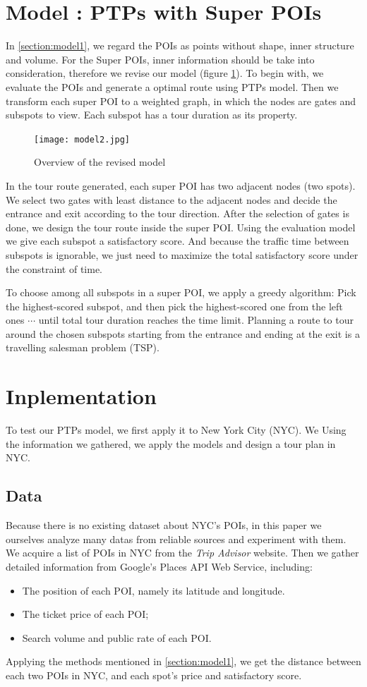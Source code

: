\documentclass{mcmthesis}
\newcommand{\RNum}[1]{\uppercase\expandafter{\romannumeral #1\relax}}
\begin{document}
\section{Model \RNum{2}: PTPs with Super POIs} \label{section:model2}
  In \ref{section:model1}, we regard the POIs as points without shape, inner structure and volume. For the Super POIs, inner information should be take into consideration, therefore we revise our model (figure \ref{fig:model2}). To begin with, we evaluate the POIs and generate a optimal route using PTPs model. Then we transform each super POI to a weighted graph, in which the nodes are gates and subspots to view. Each subspot has a tour duration as its property. \par
  \begin{figure}[h]
    \centering
    \texttt{[image: model2.jpg]}
    \caption{Overview of the revised model}
    \label{fig:model2}
  \end{figure}
  In the tour route generated, each super POI has two adjacent nodes (two spots). We select two gates with least distance to the adjacent nodes and decide the entrance and exit according to the tour direction. After the selection of gates is done, we design the tour route inside the super POI. Using the evaluation model we give each subspot a satisfactory score. And because the traffic time between subspots is ignorable, we just need to maximize the total satisfactory score under the constraint of time. \par
  To choose among all subspots in a super POI, we apply a greedy algorithm: Pick the highest-scored subspot, and then pick the highest-scored one from the left ones $\cdots$ until total tour duration reaches the time limit. Planning a route to tour around the chosen subspots starting from the entrance and ending at the exit is a travelling salesman problem (TSP).




\section{Inplementation}
  To test our PTPs model, we first apply it to New York City (NYC). We Using the information we gathered, we apply the models and design a tour plan in NYC.
\subsection{Data}
  Because there is no existing dataset about NYC's POIs, in this paper we ourselves analyze many datas from reliable sources and experiment with them. We acquire a list of POIs in NYC from the \emph{Trip Advisor} website\cite{TripAdv}. Then we gather detailed information from Google's Places API Web Service\cite{GMaps}, including:
  \begin{itemize}
    \item The position of each POI, namely its latitude and longitude.
    \item The ticket price of each POI;
    \item Search volume and public rate of each POI.
  \end{itemize}
  Applying the methods mentioned in \ref{section:model1}, we get the distance between each two POIs in NYC, and each spot's price and satisfactory score. 
\end{document}
